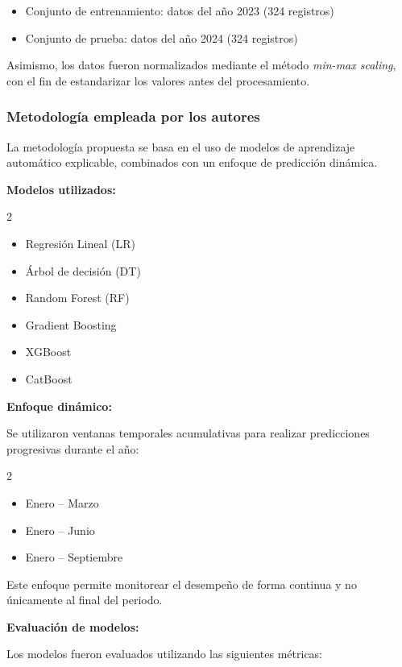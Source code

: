 \begin{itemize}
    \item Conjunto de entrenamiento: datos del año 2023 (324 registros)
    \item Conjunto de prueba: datos del año 2024 (324 registros)
\end{itemize}

Asimismo, los datos fueron normalizados mediante el método \textit{min-max scaling}, con el fin de estandarizar los valores antes del procesamiento.

\subsubsection{Metodología empleada por los autores}

La metodología propuesta se basa en el uso de modelos de aprendizaje automático explicable, combinados con un enfoque de predicción dinámica.

\textbf{Modelos utilizados:}

\begin{multicols}{2}
\begin{itemize}
    \item Regresión Lineal (LR)
    \item Árbol de decisión (DT)
    \item Random Forest (RF)
    \item Gradient Boosting
    \item XGBoost
    \item CatBoost
\end{itemize}
\end{multicols}


\textbf{Enfoque dinámico:}

Se utilizaron ventanas temporales acumulativas para realizar predicciones progresivas durante el año:

\begin{multicols}{2}
\begin{itemize}
    \item Enero – Marzo
    \item Enero – Junio
    \item Enero – Septiembre
\end{itemize}
\end{multicols}
Este enfoque permite monitorear el desempeño de forma continua y no únicamente al final del periodo.

\textbf{Evaluación de modelos:}

Los modelos fueron evaluados utilizando las siguientes métricas:

